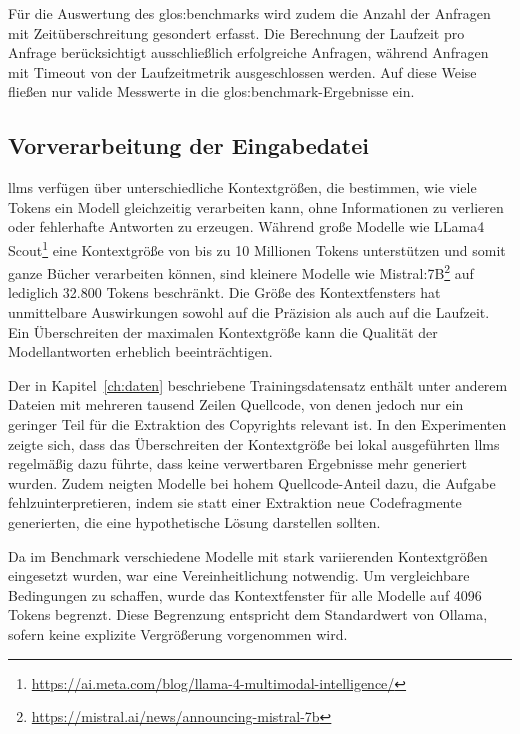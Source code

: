 Für die Auswertung des \gls{glos:benchmark}s wird zudem die Anzahl der Anfragen mit Zeitüberschreitung gesondert erfasst.
Die Berechnung der Laufzeit pro Anfrage berücksichtigt ausschließlich erfolgreiche Anfragen, während Anfragen mit Timeout von der Laufzeitmetrik ausgeschlossen werden.
Auf diese Weise fließen nur valide Messwerte in die \gls{glos:benchmark}-Ergebnisse ein.


\subsection{Vorverarbeitung der Eingabedatei}\label{subsec:vorverarbeitung-der-eingabedatei}

\glspl{llm} verfügen über unterschiedliche Kontextgrößen, die bestimmen, wie viele Tokens ein Modell gleichzeitig verarbeiten kann, ohne Informationen zu verlieren oder fehlerhafte Antworten zu erzeugen.
Während große Modelle wie LLama4 Scout\footnote{\url{https://ai.meta.com/blog/llama-4-multimodal-intelligence/}} eine Kontextgröße von bis zu 10 Millionen Tokens unterstützen und somit ganze Bücher verarbeiten können, sind kleinere Modelle wie Mistral:7B\footnote{\url{https://mistral.ai/news/announcing-mistral-7b}} auf lediglich 32.800 Tokens beschränkt.
Die Größe des Kontextfensters hat unmittelbare Auswirkungen sowohl auf die Präzision als auch auf die Laufzeit.
Ein Überschreiten der maximalen Kontextgröße kann die Qualität der Modellantworten erheblich beeinträchtigen\autocite{zhang_sinklora_2024}.

Der in Kapitel~\ref{ch:daten} beschriebene Trainingsdatensatz enthält unter anderem Dateien mit mehreren tausend Zeilen Quellcode, von denen jedoch nur ein geringer Teil für die Extraktion des Copyrights relevant ist.
In den Experimenten zeigte sich, dass das Überschreiten der Kontextgröße bei lokal ausgeführten \glspl{llm} regelmäßig dazu führte, dass keine verwertbaren Ergebnisse mehr generiert wurden.
Zudem neigten Modelle bei hohem Quellcode-Anteil dazu, die Aufgabe fehlzuinterpretieren, indem sie statt einer Extraktion neue Codefragmente generierten, die eine hypothetische Lösung darstellen sollten.

Da im Benchmark verschiedene Modelle mit stark variierenden Kontextgrößen eingesetzt wurden, war eine Vereinheitlichung notwendig.
Um vergleichbare Bedingungen zu schaffen, wurde das Kontextfenster für alle Modelle auf \num{4096} Tokens begrenzt.
Diese Begrenzung entspricht dem Standardwert von Ollama, sofern keine explizite Vergrößerung vorgenommen wird.

